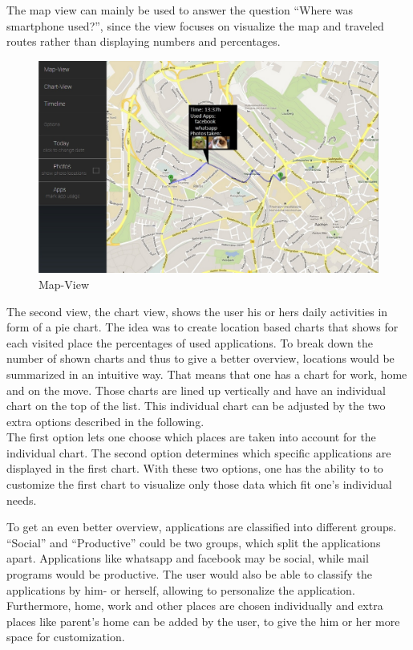 The map view can mainly be used to answer the question ``Where was smartphone used?'', since the view focuses on visualize the map and traveled routes rather than displaying numbers and percentages.
\begin{figure}[h]
	\caption{Map-View}
	\includegraphics[width=\textwidth]{images/Design/1b_onClickPageView.jpg}
\end{figure}

The  second view, the chart view, shows the user his or hers daily activities in form of a pie chart. The idea was to create location based charts that shows for each visited place the percentages of used applications. To break down the number of shown charts and thus to give a better overview, locations would be summarized in an intuitive way. That means that one has a chart for work, home and on the move. Those charts are lined up vertically and have an individual chart on the top of the list. This individual chart can be adjusted by the two extra options described in the following.\\
The  first option lets one choose which places are taken into account for the individual chart. The second option determines which specific applications are displayed in the first chart. With these two options, one has the ability to to customize the first chart to visualize only those data which fit one's individual needs.

To  get an even better overview, applications are classified into different groups. ``Social'' and ``Productive'' could be two groups, which split the applications apart. Applications like whatsapp and facebook may be social, while mail programs would be productive. The user would also be able to classify the applications by him- or herself, allowing to personalize the application. Furthermore, home, work and other places are chosen individually and extra places like parent's home can be added by the user, to give the him or her more space for customization.

